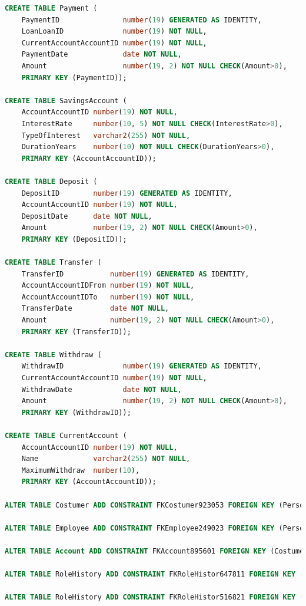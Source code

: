 \documentclass[a4paper, 10pt]{article}
\begin{document}
\begin{lstlisting}[language=SQL]
CREATE TABLE Payment (
    PaymentID               number(19) GENERATED AS IDENTITY, 
    LoanLoanID              number(19) NOT NULL, 
    CurrentAccountAccountID number(19) NOT NULL, 
    PaymentDate             date NOT NULL, 
    Amount                  number(19, 2) NOT NULL CHECK(Amount>0), 
    PRIMARY KEY (PaymentID));

CREATE TABLE SavingsAccount (
    AccountAccountID number(19) NOT NULL, 
    InterestRate     number(10, 5) NOT NULL CHECK(InterestRate>0), 
    TypeOfInterest   varchar2(255) NOT NULL, 
    DurationYears    number(10) NOT NULL CHECK(DurationYears>0), 
    PRIMARY KEY (AccountAccountID));

CREATE TABLE Deposit (
    DepositID        number(19) GENERATED AS IDENTITY, 
    AccountAccountID number(19) NOT NULL, 
    DepositDate      date NOT NULL, 
    Amount           number(19, 2) NOT NULL CHECK(Amount>0), 
    PRIMARY KEY (DepositID));

CREATE TABLE Transfer (
    TransferID           number(19) GENERATED AS IDENTITY, 
    AccountAccountIDFrom number(19) NOT NULL, 
    AccountAccountIDTo   number(19) NOT NULL, 
    TransferDate         date NOT NULL, 
    Amount               number(19, 2) NOT NULL CHECK(Amount>0), 
    PRIMARY KEY (TransferID));

CREATE TABLE Withdraw (
    WithdrawID              number(19) GENERATED AS IDENTITY, 
    CurrentAccountAccountID number(19) NOT NULL, 
    WithdrawDate            date NOT NULL, 
    Amount                  number(19, 2) NOT NULL CHECK(Amount>0), 
    PRIMARY KEY (WithdrawID));

CREATE TABLE CurrentAccount (
    AccountAccountID number(19) NOT NULL, 
    Name             varchar2(255) NOT NULL, 
    MaximumWithdraw  number(10), 
    PRIMARY KEY (AccountAccountID));

ALTER TABLE Costumer ADD CONSTRAINT FKCostumer923053 FOREIGN KEY (PersonGovID) REFERENCES Person (GovID);

ALTER TABLE Employee ADD CONSTRAINT FKEmployee249023 FOREIGN KEY (PersonGovID) REFERENCES Person (GovID);

ALTER TABLE Account ADD CONSTRAINT FKAccount895601 FOREIGN KEY (CostumerCostumerID) REFERENCES Costumer (CostumerID);

ALTER TABLE RoleHistory ADD CONSTRAINT FKRoleHistor647811 FOREIGN KEY (RoleRoleID) REFERENCES Role (RoleID);

ALTER TABLE RoleHistory ADD CONSTRAINT FKRoleHistor516821 FOREIGN KEY (EmployeeEmployeeID) REFERENCES Employee (EmployeeID);


\end{lstlisting}
\end{document}
